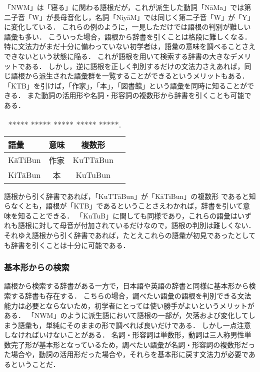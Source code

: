 \documentclass[technicalreport]{ieicej}
\begin{document}
「NWM」は「寝る」に関わる語根だが，これが派生した動詞「NāMa」では第二子音「W」が長母音化し，名詞「NiyāM」では同じく第二子音「W」が「Y」に変化している．
これらの例のように，一見しただけでは語根の判別が難しい語彙も多い．
こういった場合，語根から辞書を引くことは格段に難しくなる．
特に文法力がまだ十分に備わっていない初学者は，語彙の意味を調べることさえできないという状態に陥る．
これが語根を用いて検索する辞書の大きなデメリットである．
しかし，逆に語根を正しく判別するだけの文法力さえあれば，同じ語根から派生された語彙群を一覧することができるというメリットもある．
「KTB」を引けば，「作家」，「本」，「図書館」という語彙を同時に知ることができる．
また動詞の活用形や名詞・形容詞の複数形から辞書を引くことも可能である．

\begin{table}[ht]
\begin{center}
\begin{tabular}{l|ccc}
   語彙 & 意味 & 複数形\\
  \hline
 KāTiBun & 作家 & KuTTāBun \\
  KiTāBun & 本 & KuTuBun\\
\hline
\end{tabular}
\caption{***** ***** ***** ***** *****.}
\label{table:alignment}
\end{center}
\end{table}

語根から引く辞書であれば，「KuTTāBun」が「KāTiBun」の複数形 であると知らなくとも，語根が「KTB」であるということさえわかれば，辞書を引いて意味を知ることできる．
「KuTuB」に関しても同様であり，これらの語彙はいずれも語根に対して母音が付加されているだけなので，語根の判別は難しくない．
それゆえ語根から引く辞書であれば，たとえこれらの語彙が初見であったとしても辞書を引くことは十分に可能である．

\subsubsection{基本形からの検索}
語根から検索する辞書がある一方で，日本語や英語の辞書と同様に基本形から検索する辞書も存在する．
こちらの場合，調べたい語彙の語根を判別できる文法能力は必要とならないため，初学者にとっては使い勝手がよいというメリットがある．
「NWM」のように派生語において語根の一部が，欠落および変化してしまう語彙も，単純にそのままの形で調べれば良いだけである．
しかし一点注意しなければいけないことがある．
名詞・形容詞は単数形，動詞は三人称男性単数完了形が基本形となっているため，調べたい語彙が名詞・形容詞の複数形だった場合や，動詞の活用形だった場合や，それらを基本形に戻す文法力が必要であるということだ．
\end{document}
